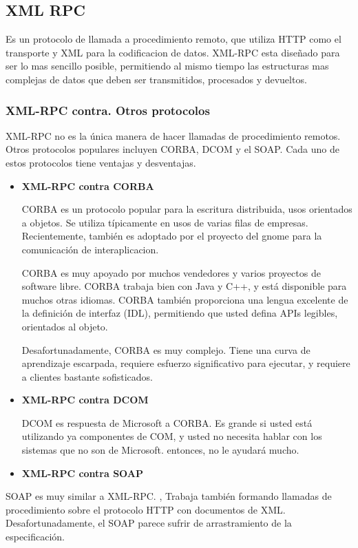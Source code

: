 \subsection{XML RPC}
Es un protocolo de llamada a procedimiento remoto, que utiliza HTTP como el transporte y XML para la codificacion de datos. XML-RPC esta diseñado para ser lo mas sencillo posible, permitiendo al mismo tiempo las estructuras mas complejas de datos que deben ser transmitidos, procesados y devueltos.

\subsubsection{XML-RPC contra. Otros protocolos}

XML-RPC no es la única manera de hacer llamadas de procedimiento remotos. Otros protocolos populares incluyen CORBA, DCOM y el SOAP. Cada uno de estos protocolos tiene ventajas y desventajas.

\begin{itemize} 

\item \textbf{XML-RPC contra CORBA}

CORBA es un protocolo popular para la escritura distribuida, usos orientados a objetos. Se utiliza típicamente en usos de varias filas de empresas. Recientemente, también es adoptado por el proyecto del gnome para la comunicación de interaplicacion.

CORBA es muy apoyado por muchos vendedores y varios proyectos de software libre. CORBA trabaja bien con Java y C++, y está disponible para muchos otras idiomas. CORBA también proporciona una lengua excelente de la definición de interfaz (IDL), permitiendo que usted defina APIs legibles, orientados al objeto.

Desafortunadamente, CORBA es muy complejo. Tiene una curva de aprendizaje escarpada, requiere esfuerzo significativo para ejecutar, y requiere a clientes bastante sofisticados.

\item \textbf{XML-RPC contra DCOM}

DCOM es respuesta de Microsoft a CORBA. Es grande si usted está utilizando ya componentes de COM, y usted no necesita hablar con los sistemas que no son de Microsoft. entonces, no le ayudará mucho.

\item \textbf{XML-RPC contra SOAP}
\end{itemize}
SOAP es muy similar a XML-RPC. , Trabaja también formando llamadas de procedimiento sobre el protocolo HTTP con documentos de XML. Desafortunadamente, el SOAP parece sufrir de arrastramiento de la especificación.

